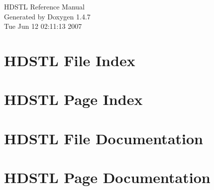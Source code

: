 \documentclass[a4paper]{book}
\begin{document}
\begin{titlepage}
\vspace*{7cm}
\begin{center}
{\Large HDSTL Reference Manual}\\
\vspace*{1cm}
{\large Generated by Doxygen 1.4.7}\\
\vspace*{0.5cm}
{\small Tue Jun 12 02:11:13 2007}\\
\end{center}
\end{titlepage}
\clearemptydoublepage
{}
\tableofcontents
\clearemptydoublepage
{}
\chapter{HDSTL File Index}

\chapter{HDSTL Page Index}

\chapter{HDSTL File Documentation}



\chapter{HDSTL Page Documentation}



\printindex
\end{document}
